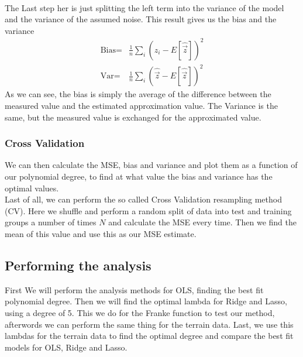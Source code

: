 \documentclass[11pt, A4paper, english]{article}
\begin{document}
\begin{multicols}{2}
\begin{align*}
				\end{align*}
The Last step her is just splitting the left term into the variance of the model and the variance of the assumed noise. This result gives us the bias and the variance
				\begin{align}
\text{Bias} =& \frac{1}{n} \sum_i \left( z_i - E[\hat{\vec{z}}] \right)^2 \\
\text{Var} =& \frac{1}{n} \sum_i \left( \hat{\vec{z}} - E[\hat{\vec{z}}] \right)^2
				\end{align}
As we can see, the bias is simply the average of the difference between the measured value and the estimated approximation value. The Variance is the same, but the measured value is exchanged for the approximated value. \\

				\subsubsection{Cross Validation}
We can then calculate the MSE, bias and variance and plot them as a function of our polynomial degree, to find at what value the bias and variance has the optimal values. \\
Last of all, we can perform the so called Cross Validation resampling method (CV). Here we shuffle and perform a random split of data into test and training groups a number of times $N$ and calculate the MSE every time. Then we find the mean of this value and use this as our MSE estimate.

				\subsection{Performing the analysis}
First We will perform the analysis methods for OLS, finding the best fit polynomial degree. Then we will find the optimal lambda for Ridge and Lasso, using a degree of 5. This we do for the Franke function to test our method, afterwords we can perform the same thing for the terrain data. Last, we use this lambdas for the terrain data to find the optimal degree and compare the best fit models for OLS, Ridge and Lasso.


\end{multicols}
\end{document}

